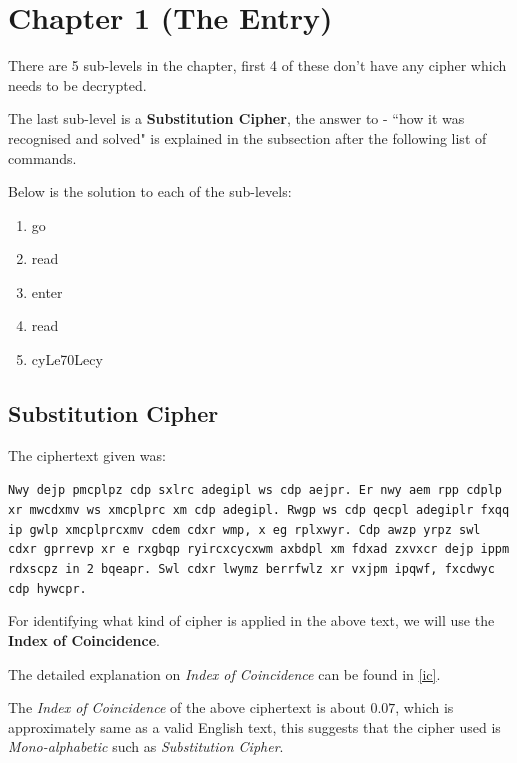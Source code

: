 \documentclass[10pt,twoside]{article}
\begin{document}


\section{Chapter 1 (The Entry)}

There are 5 sub-levels in the chapter, first 4 of these don't have any cipher which needs to be decrypted. \newline

The last sub-level is a \textbf{Substitution Cipher}, the answer to - ``how it was recognised and solved" is explained in the subsection after the following list of commands. \newline

Below is the solution to each of the sub-levels:
\begin{enumerate}
  \setlength\itemsep{0em}
  \item go
  \item read
  \item enter
  \item read
  \item cyLe70Lecy
\end{enumerate}

\subsection{Substitution Cipher}

The ciphertext given was: \newline

\texttt{Nwy dejp pmcplpz cdp sxlrc adegipl ws cdp aejpr. Er nwy aem rpp cdplp xr mwcdxmv ws xmcplprc xm cdp adegipl. Rwgp ws cdp qecpl adegiplr fxqq ip gwlp xmcplprcxmv cdem cdxr wmp, x eg rplxwyr. Cdp awzp yrpz swl cdxr gprrevp xr e rxgbqp ryircxcycxwm axbdpl xm fdxad zxvxcr dejp ippm rdxscpz in 2 bqeapr. Swl cdxr lwymz berrfwlz xr vxjpm ipqwf, fxcdwyc cdp hywcpr.} \newline

For identifying what kind of cipher is applied in the above text, we will use the \textbf{Index of Coincidence}. \newline

The detailed explanation on \textit{Index of Coincidence} can be found in \cref{ic}. \newline

The \textit{Index of Coincidence} of the above ciphertext is about $0.07$, which is approximately same as a valid English text, this suggests that the cipher used is \textit{Mono-alphabetic} such as \textit{Substitution Cipher}. \newline
\end{document}
